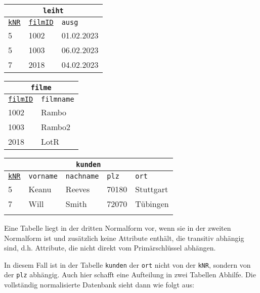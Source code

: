\begin{minipage}{\textwidth}
	\begin{minipage}{0.3\textwidth}
		\begin{tabular}{lll}
			\multicolumn{3}{c}{\lstinline!leiht!}\\
			\hline
			\underline{\lstinline!kNR!}&\underline{\lstinline!filmID!}&\lstinline!ausg!\\
			\hline
			5&1002&01.02.2023\\
			5&1003&06.02.2023\\
			7&2018&04.02.2023\\
		\end{tabular}
	\end{minipage}
	\begin{minipage}{0.228\textwidth}
		\begin{tabular}{ll}
			\multicolumn{2}{c}{\lstinline!filme!}\\
			\hline
			\underline{\lstinline!filmID!}&\lstinline!filmname!\\
			\hline
			1002&Rambo\\
			1003&Rambo2\\
			2018&LotR\\
		\end{tabular}
	\end{minipage}
	\begin{minipage}{0.472\textwidth}
		\begin{tabular}{lllll}
			\multicolumn{5}{c}{\lstinline!kunden!}\\
			\hline
			\underline{\lstinline!kNR!}&\lstinline!vorname!&\lstinline!nachname!&\lstinline!plz!&\lstinline!ort!\\
			\hline
			5&Keanu&Reeves&70180&Stuttgart\\
			7&Will&Smith&72070&Tübingen\\
			\phantom{0}&&&&\\
		\end{tabular}
	\end{minipage}
\end{minipage}
\begin{tcolorbox}[title=Dritte Normalform]
	Eine Tabelle liegt in der dritten Normalform vor, wenn sie in der zweiten Normalform ist und zusätzlich keine Attribute enthält, die transitiv abhängig sind, d.h. Attribute, die nicht direkt vom Primärschlüssel abhängen.
\end{tcolorbox}
In diesem Fall ist in der Tabelle \lstinline!kunden! der \lstinline!ort! nicht von der \lstinline!kNR!, sondern von der \lstinline!plz! abhängig. Auch hier schafft eine Aufteilung in zwei Tabellen Abhilfe. Die vollständig normalisierte Datenbank sieht dann wie folgt aus:
